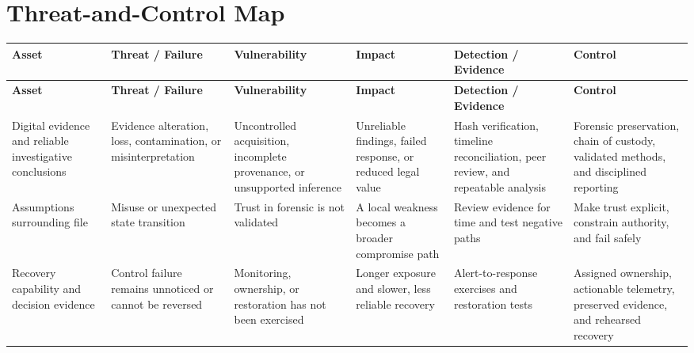 \documentclass[11pt,letterpaper]{article}
\begin{document}
\section*{Threat-and-Control Map}
\begingroup\scriptsize\setlength{\tabcolsep}{2pt}
\begin{longtable}{>{\raggedright\arraybackslash}p{}>{\raggedright\arraybackslash}p{}>{\raggedright\arraybackslash}p{}>{\raggedright\arraybackslash}p{}>{\raggedright\arraybackslash}p{}>{\raggedright\arraybackslash}p{}}
\toprule\rowcolor{Navy}\color{white}\textbf{Asset} & \color{white}\textbf{Threat / Failure} & \color{white}\textbf{Vulnerability} & \color{white}\textbf{Impact} & \color{white}\textbf{Detection / Evidence} & \color{white}\textbf{Control}\\\midrule
\endfirsthead
\toprule\rowcolor{Navy}\color{white}\textbf{Asset} & \color{white}\textbf{Threat / Failure} & \color{white}\textbf{Vulnerability} & \color{white}\textbf{Impact} & \color{white}\textbf{Detection / Evidence} & \color{white}\textbf{Control}\\\midrule
\endhead
Digital evidence and reliable investigative conclusions & Evidence alteration, loss, contamination, or misinterpretation & Uncontrolled acquisition, incomplete provenance, or unsupported inference & Unreliable findings, failed response, or reduced legal value & Hash verification, timeline reconciliation, peer review, and repeatable analysis & Forensic preservation, chain of custody, validated methods, and disciplined reporting\\\midrule
Assumptions surrounding file & Misuse or unexpected state transition & Trust in forensic is not validated & A local weakness becomes a broader compromise path & Review evidence for time and test negative paths & Make trust explicit, constrain authority, and fail safely\\\midrule
Recovery capability and decision evidence & Control failure remains unnoticed or cannot be reversed & Monitoring, ownership, or restoration has not been exercised & Longer exposure and slower, less reliable recovery & Alert-to-response exercises and restoration tests & Assigned ownership, actionable telemetry, preserved evidence, and rehearsed recovery\\\midrule
\bottomrule
\end{longtable}
\endgroup
\end{document}

